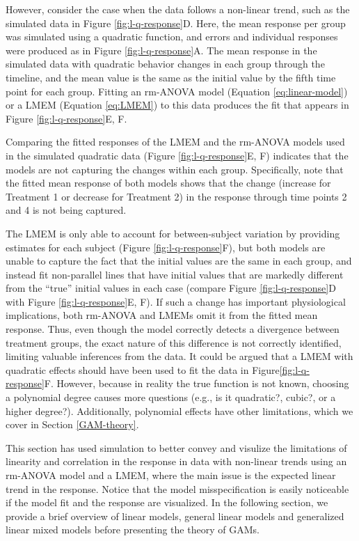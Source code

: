 \documentclass[
]{article}
\begin{document}
However, consider the case when the data follows a non-linear trend, such as the simulated data in Figure \ref{fig:l-q-response}D. Here, the mean response per group was simulated using a quadratic function, and errors and individual responses were produced as in Figure \ref{fig:l-q-response}A. The mean response in the simulated data with quadratic behavior changes in each group through the timeline, and the mean value is the same as the initial value by the fifth time point for each group. Fitting an rm-ANOVA model (Equation \eqref{eq:linear-model}) or a LMEM (Equation \eqref{eq:LMEM}) to this data produces the fit that appears in Figure \ref{fig:l-q-response}E, F.

Comparing the fitted responses of the LMEM and the rm-ANOVA models used in the simulated quadratic data (Figure \ref{fig:l-q-response}E, F) indicates that the models are not capturing the changes within each group. Specifically, note that the fitted mean response of both models shows that the change (increase for Treatment 1 or decrease for Treatment 2) in the response through time points 2 and 4 is not being captured.

The LMEM is only able to account for between-subject variation by providing estimates for each subject (Figure \ref{fig:l-q-response}F), but both models are unable to capture the fact that the initial values are the same in each group, and instead fit non-parallel lines that have initial values that are markedly different from the ``true'' initial values in each case (compare Figure \ref{fig:l-q-response}D with Figure \ref{fig:l-q-response}E, F). If such a change has important physiological implications, both rm-ANOVA and LMEMs omit it from the fitted mean response. Thus, even though the model correctly detects a divergence between treatment groups, the exact nature of this difference is not correctly identified, limiting valuable inferences from the data. It could be argued that a LMEM with quadratic effects should have been used to fit the data in Figure\ref{fig:l-q-response}F. However, because in reality the true function is not known, choosing a polynomial degree causes more questions (e.g., is it quadratic?, cubic?, or a higher degree?). Additionally, polynomial effects have other limitations, which we cover in Section \ref{GAM-theory}.

This section has used simulation to better convey and visulize the limitations of linearity and correlation in the response in data with non-linear trends using an rm-ANOVA model and a LMEM, where the main issue is the expected linear trend in the response. Notice that the model misspecification is easily noticeable if the model fit and the response are visualized. In the following section, we provide a brief overview of linear models, general linear models and generalized linear mixed models before presenting the theory of GAMs.
\end{document}
